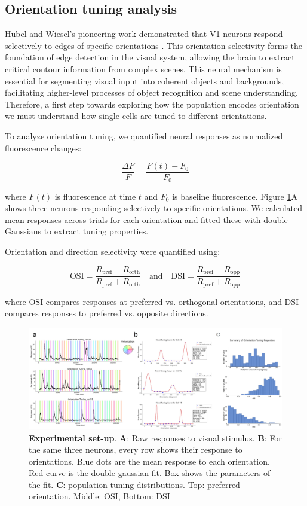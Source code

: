 \documentclass[11pt,a4paper]{article}
\begin{document}
\subsection{Orientation tuning analysis}

Hubel and Wiesel's pioneering work demonstrated that V1 neurons respond selectively to edges of specific orientations \cite{hubel1959receptive}. This orientation selectivity forms the foundation of edge detection in the visual system, allowing the brain to extract critical contour information from complex scenes. This neural mechanism is essential for segmenting visual input into coherent objects and backgrounds, facilitating higher-level processes of object recognition and scene understanding. Therefore, a first step towards exploring how the population encodes orientation we must understand how single cells are tuned to different orientations.

To analyze orientation tuning, we quantified neural responses as normalized fluorescence changes:

$$\frac{\Delta F}{F} = \frac{F(t) - F_0}{F_0}$$

where $F(t)$ is fluorescence at time $t$ and $F_0$ is baseline fluorescence. Figure \ref{fig:analysis.jpg}A shows three neurons responding selectively to specific orientations. We calculated mean responses across trials for each orientation and fitted these with double Gaussians to extract tuning properties.

Orientation and direction selectivity were quantified using:

$$\text{OSI} = \frac{R_{\text{pref}} - R_{\text{orth}}}{R_{\text{pref}} + R_{\text{orth}}} \quad \text{and} \quad \text{DSI} = \frac{R_{\text{pref}} - R_{\text{opp}}}{R_{\text{pref}} + R_{\text{opp}}}$$

where OSI compares responses at preferred vs. orthogonal orientations, and DSI compares responses to preferred vs. opposite directions. \\

\begin{figure}[h!] 
    \centering
    \includegraphics[width=\linewidth]{results/analysis-figure.jpg}
    \caption{\textbf{Experimental set-up}. \textbf{A}: Raw responses to visual stimulus. \textbf{B}: For the same three neurons, every row shows their response to orientations. Blue dots are the mean response to each orientation. Red curve is the double gaussian fit. Box shows the parameters of the fit. \textbf{C}: population tuning distributions. Top: preferred orientation. Middle: OSI, Bottom: DSI} 
    \label{fig:analysis.jpg}
\end{figure}
\end{document}
